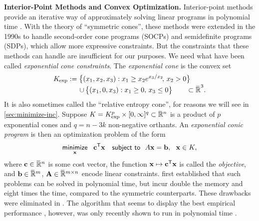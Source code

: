 \textbf{Interior-Point Methods and Convex Optimization.}
Interior-point methods provide an iterative way of approximately solving linear programs in polynomial time \parencite{karmarkar1984new}.
With the theory of ``symmetric cones'', these methods were extended in the 1990s to handle second-order cone programs (SOCPs) and semidefinite programs (SDPs), which allow more expressive constraints.
But the constraints that these methods can handle are insufficient for
our purposes. We need what have been called \emph{exponential cone constraints}.
The \emph{exponential cone} is the convex set
\begin{align*}
        \begin{aligned}
        K_{\mskip-1mu\exp} :=
        \big\{ (x_1, x_2, x_3) &:
                x_1 \ge x_2 e^{x_3 / x_2}\!,\, x_2 > 0 \big\}
            \\[-0.6ex]\quad \mathbin{\cup}\,
        \big\{ (x_1, 0, x_3&) : x_1 \ge 0,\, x_3 \le 0 \big\}
        \qquad \subset \mathbb {\mskip1mu\overline{\mskip-1mu\mathbb R\!}\,}^3.
    \end{aligned}
\end{align*}
It is also sometimes called the ``relative entropy cone'', for reasons we will see in \cref{sec:minimize-inc}.
Suppose $K  =  K_{\exp}^p  \times [0, \infty]^q 
\subset \smash{\mskip1mu\overline{\mskip-1mu\mathbb R\!}\,}^n$ is a product of $p$ exponential cones and $q = n - 3k$ non-negative orthants.
An \emph{exponential conic program} is then an optimization problem of the form
\begin{equation}
    \minimize
        _{\mat x}
        ~~ \mat c^{\sf T} \mat x
    \quad\subjto
    ~~ A \mat x = \mat b,~~\mat x \in 
        K,
        \label{eq:exp-conic-program}
\end{equation}
where $\mathbf c \in \mskip1mu\overline{\mskip-1mu\mathbb R\!}\,^{n}$ is some cost vector,
the function $\mathbf x \mapsto \mathbf c^{\sf T} \mathbf x$ is called the \emph{objective},
and $\mathbf b \in \mskip1mu\overline{\mskip-1mu\mathbb R\!}\,^m$, $\mathbf A \in \mskip1mu\overline{\mskip-1mu\mathbb R\!}\,^{m \times n}$ encode linear constraints.
\textcite*{nesterov1996infeasible} first established that such problems can be solved in polynomial time, but incur double the memory and eight times the time, compared to the symmetric counterparts. These drawbacks were eliminated in \cite{skajaa2015homogeneous}.
The algorithm that seems to display the best empirical performance \parencite{dahl2022primal}, however, was only recently shown to
run in polynomial time \parencite{badenbroek2021algorithm}.

